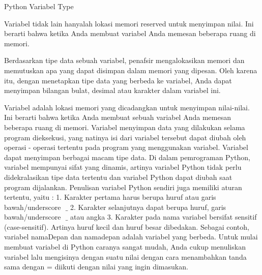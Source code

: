 \sloppy
Python Variabel Type  \par
\vspace{12pt}
\noindent 
Variabel tidak lain hanyalah lokasi memori reserved untuk menyimpan nilai. $  $Ini berarti bahwa ketika Anda membuat variabel Anda memesan beberapa ruang di memori. \par
\noindent 
Berdasarkan tipe data sebuah variabel, penafsir mengalokasikan memori dan memutuskan apa yang dapat disimpan dalam memori yang dipesan. $  $Oleh karena itu, dengan menetapkan tipe data yang berbeda ke variabel, Anda dapat menyimpan bilangan bulat, desimal atau karakter dalam variabel ini. \par
\noindent 
Variabel adalah lokasi memori yang dicadangkan untuk menyimpan nilai-nilai. Ini berarti bahwa ketika Anda membuat sebuah variabel Anda memesan beberapa ruang di memori. Variabel menyimpan data yang dilakukan selama program dieksekusi, yang natinya isi dari variabel tersebut dapat diubah oleh operasi - operasi tertentu pada program yang menggunakan variabel.\vspace{\baselineskip}
\vspace{\baselineskip}
Variabel dapat menyimpan berbagai macam $  $tipe data. Di dalam pemrograman Python, variabel mempunyai sifat yang dinamis, artinya variabel Python tidak perlu didekralasikan tipe data tertentu dan variabel Python dapat diubah saat program dijalankan.\vspace{\baselineskip}
\vspace{\baselineskip}
Penulisan variabel Python sendiri juga memiliki aturan tertentu, yaitu :\vspace{\baselineskip}
1. Karakter pertama harus berupa huruf atau garis bawah/underscore $  $ $  \_  $\vspace{\baselineskip}
2. Karakter selanjutnya dapat berupa huruf, garis bawah/underscore $  $ $  \_  $ $  $atau angka\vspace{\baselineskip}
3. Karakter pada nama variabel bersifat sensitif (case-sensitif). Artinya huruf kecil dan huruf besar dibedakan. Sebagai contoh, variabel $  $namaDepan $  $dan $  $namadepan $  $adalah variabel yang berbeda.\vspace{\baselineskip}
\vspace{\baselineskip}
Untuk mulai membuat variabel di Python caranya sangat mudah, Anda cukup menuliskan variabel lalu mengisinya dengan suatu nilai dengan cara menambahkan tanda sama dengan $  $= $  $diikuti dengan nilai yang ingin dimasukan. \par
